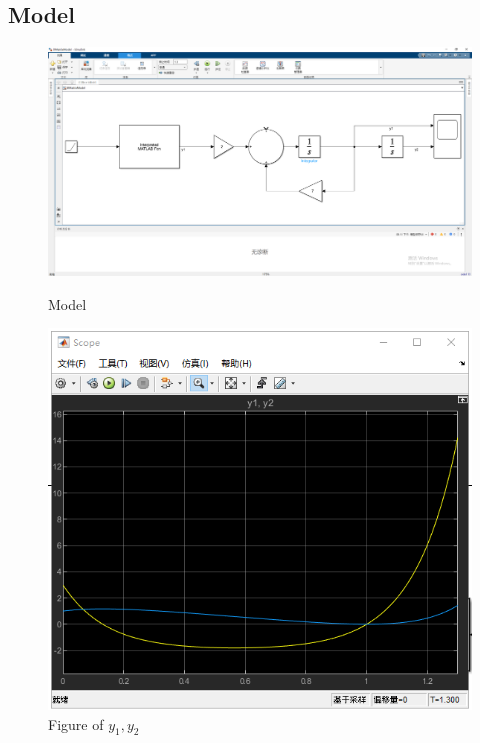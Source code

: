 \documentclass[12pt,a4paper,oneside]{ctexart}
\begin{document}
        \subsection{Model}
        \begin{figure}[H]
            \centering
            \includegraphics[width = 0.8\linewidth]{../model.PNG}
            \caption{Model}
            \includegraphics[width = 0.8\linewidth]{../shot.PNG}
            \caption{Figure of $y_1,y_2$}
        \end{figure}
\end{document}
